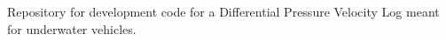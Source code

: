 Repository for development code for a Differential Pressure Velocity Log meant for underwater vehicles. 